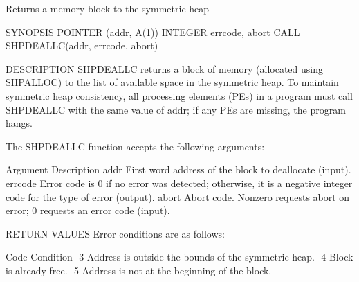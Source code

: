        Returns a memory block to the symmetric heap

SYNOPSIS
       POINTER (addr, A(1))
       INTEGER errcode, abort
       CALL SHPDEALLC(addr, errcode, abort)

DESCRIPTION
       SHPDEALLC  returns  a block of memory (allocated using SHPALLOC) to the
       list of available space in the symmetric heap.  To  maintain  symmetric
       heap  consistency, all processing elements (PEs) in a program must call
       SHPDEALLC with the same value of addr; if  any  PEs  are	 missing,  the
       program hangs.

       The SHPDEALLC function accepts the following arguments:

       Argument	      Description
       addr	      First word address of the block to deallocate (input).
       errcode	      Error  code is 0 if no error was detected; otherwise, it
		      is a  negative  integer  code  for  the  type  of	 error
		      (output).
       abort	      Abort code.  Nonzero requests abort on error; 0 requests
		      an error code (input).

RETURN VALUES
       Error conditions are as follows:

       Code	      Condition
       -3	      Address is outside the bounds of the symmetric heap.
       -4	      Block is already free.
       -5	      Address is not at the beginning of the block.

